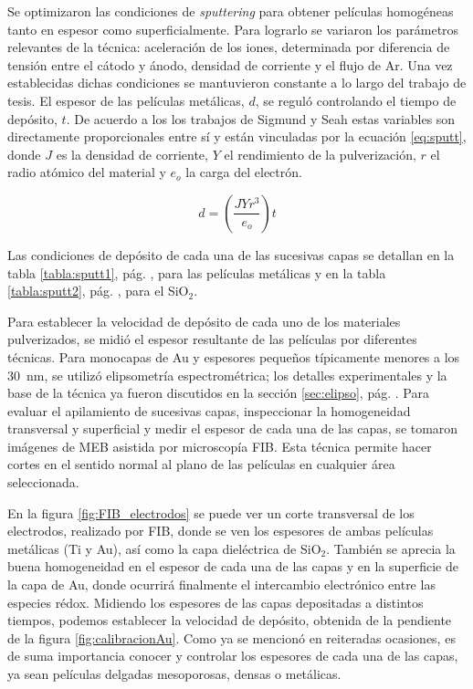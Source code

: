 		 Se optimizaron las condiciones de \textit{sputtering} para obtener películas homogéneas tanto en espesor como superficialmente. Para lograrlo se variaron los parámetros relevantes de la técnica: aceleración de los iones, determinada por diferencia de tensión entre el cátodo y ánodo, densidad de corriente y el flujo de Ar. Una vez establecidas dichas condiciones se mantuvieron constante a lo largo del trabajo de tesis. El espesor de las películas metálicas, $d$, se reguló controlando el tiempo de depósito, $t$. De acuerdo a los los trabajos de Sigmund\cite{sigmund1968} y Seah\cite{Seah2005} estas variables son directamente proporcionales entre sí y están vinculadas por la ecuación \ref{eq:sputt}, donde $J$ es la densidad de corriente, $Y$ el rendimiento de la pulverización, $r$ el radio atómico del material y $e_o$ la carga del electrón.

	 			\begin{equation}
	 				d=\left(\frac{JYr^3}{e_o}\right)t
	 				\label{eq:sputt}
	 			\end{equation}

		 Las condiciones de depósito de cada una de las sucesivas capas se detallan en la tabla \ref{tabla:sputt1}, pág. \pageref{tabla:sputt1}, para las películas metálicas y en la tabla  \ref{tabla:sputt2}, pág. \pageref{tabla:sputt2}, para el SiO$_2$. 

		 Para establecer la velocidad de depósito de cada uno de los materiales pulverizados, se midió el espesor resultante de las películas por diferentes técnicas. Para monocapas de Au y espesores pequeños típicamente menores a los \SI{30}{\nm}, se utilizó elipsometría espectrométrica; los detalles experimentales y la base de la técnica ya fueron discutidos en la sección \ref{sec:elipso}, pág. \pageref{sec:elipso}. Para evaluar el apilamiento de sucesivas capas, inspeccionar la homogeneidad transversal y superficial y medir el espesor de cada una de las capas, se tomaron imágenes de MEB asistida por microscopía FIB. Esta técnica permite hacer cortes en el sentido normal al plano de las películas en cualquier área seleccionada.
		
		 En la figura \ref{fig:FIB_electrodos} se puede ver un corte transversal de los electrodos, realizado por FIB, donde se ven los espesores de ambas películas metálicas (Ti y Au), así como la capa dieléctrica de SiO$_2$. También se aprecia la buena homogeneidad en el espesor de cada una de las capas y en la superficie de la capa de Au, donde ocurrirá finalmente el intercambio electrónico entre las especies rédox. Midiendo los espesores de las capas depositadas a distintos tiempos, podemos establecer la velocidad de depósito, obtenida de la pendiente de la figura \ref{fig:calibracionAu}. Como ya se mencionó en reiteradas ocasiones, es de suma importancia conocer y controlar los espesores de cada una de las capas, ya sean películas delgadas mesoporosas, densas o metálicas.


